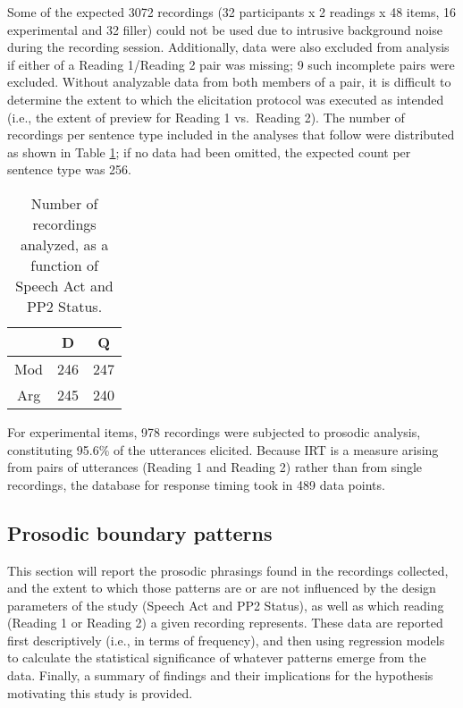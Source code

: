 \documentclass[11pt,oneside]{book}
\begin{document}
Some of the expected 3072 recordings (32 participants x 2 readings x 48 items, 16 experimental and 32 filler) could not be used due to intrusive background noise during the recording session. Additionally, data were also excluded from analysis if either of a Reading 1/Reading 2 pair was missing; 9 such incomplete pairs were excluded. Without analyzable data from both members of a pair, it is difficult to determine the extent to which the elicitation protocol was executed as intended (i.e., the extent of preview for Reading 1 vs.~Reading 2). The number of recordings per sentence type included in the analyses that follow were distributed as shown in Table \ref{tab:rvtab}; if no data had been omitted, the expected count per sentence type was 256.

\begin{table}[!h]

\caption{\label{tab:rvtab}Number of recordings analyzed, as a function of Speech Act and PP2 Status.}
\centering
\begin{tabular}{ccc}
\toprule
  & D & Q\\
\midrule
Mod & 246 & 247\\
Arg & 245 & 240\\
\bottomrule
\end{tabular}
\end{table}

For experimental items, 978 recordings were subjected to prosodic analysis, constituting 95.6\% of the utterances elicited. Because IRT is a measure arising from pairs of utterances (Reading 1 and Reading 2) rather than from single recordings, the database for response timing took in 489 data points.

\hypertarget{results-prosody}{%
\subsection{Prosodic boundary patterns}\label{results-prosody}}

This section will report the prosodic phrasings found in the recordings collected, and the extent to which those patterns are or are not influenced by the design parameters of the study (Speech Act and PP2 Status), as well as which reading (Reading 1 or Reading 2) a given recording represents. These data are reported first descriptively (i.e., in terms of frequency), and then using regression models to calculate the statistical significance of whatever patterns emerge from the data. Finally, a summary of findings and their implications for the hypothesis motivating this study is provided.
\end{document}
